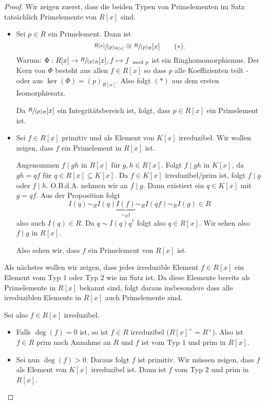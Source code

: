 \begin{proof}
	Wir zeigen zuerst, dass die beiden Typen von Primelementen im Satz tatsächlich Primelemente von $R[x]$ sind.
	\begin{itemize}
		\item Sei $p \in R$ ein Primelement. Dann ist 
			\[
				\sfrac{R[x]}{(p)_{R[x]}} \cong \sfrac{R}{(p)_{R}}[x] \tag{$*$}
			.\]
			Warum: $\Phi: R[x] \to \sfrac{R}{(p)_{R}}[x], f \mapsto f_{\mod p}$ ist ein Ringhomomorphismus.
			Der Kern von $\Phi$ besteht aus allen $f \in R[x]$ so dass $p$ alle Koeffizienten teilt - oder aus $\ker(\Phi) = (p)_{R[x]}$.
			Also folgt $(*)$ aus dem ersten Isomorphiesatz.

			Da $\sfrac{R}{(p)_{R}}[x]$ ein Integritätsbereich ist, folgt, dass $p \in R[x]$ ein Primelement ist.

		\item Sei $f \in R[x]$ primitiv und als Element von $K[x]$ irreduzibel.
			Wir wollen zeigen, dass $f$ ein Primelement in $R[x]$ ist.

			Angenommen $f \mid gh$ in $R[x]$ für $g,h \in R[x]$.
			Folgt $f \mid gh $ in $K[x]$, da $gh = qf$ für $q \in R[x] \subseteq K[x]$.
			Da $f \in K[x]$ irreduzibel/prim ist, folgt $f \mid g$ oder $f \mid h$.
			O.B.d.A. nehmen wir an $f \mid g$. Dann existiert ein $q \in K[x]$ mit $g = q f$.
			Aus der Proposition folgt 
			\[
				I(q) \sim_{R} I(q) \underbrace{I(f)}_{\sim_{R} 1} \sim_{R} I(qf) \sim_{R} I(g) \in R
			\]
			also auch $I(q) \in R$. Da $q \sim I(q) q^{*}$ folgt also $q \in R[x]$.
			Wir sehen also $f \mid g$ in $R[x]$.

			Also sehen wir, dass $f$ ein Primelement von $R[x]$ ist. 
	\end{itemize}
	Als nächstes wollen wir zeigen, dass jedes irreduzible Element $f \in R[x]$ ein Element vom Typ $1$ oder Typ $2$ wie im Satz ist.
	Da diese Elemente bereits als Primelemente in $R[x]$ bekannt sind, folgt daraus insbesondere dass alle irreduziblen Elemente in $R[x]$ auch
	Primelemente sind.

	Sei also $f \in R[x]$ irreduzibel.
	\begin{itemize}
		\item Falls $\deg(f) = 0$ ist, so ist $f \in R$ irreduzibel ($R[x]^{\times} = R^{\times}$).
			Also ist $f \in R$  prim nach Annahme an $R$ und $f$ ist vom Typ $1$ und prim in $R[x]$.
		\item Sei nun $\deg(f) > 0$. Daraus folgt $f$ ist primitiv.
			Wir müssen zeigen, dass $f$ als Element von $K[x]$ irreduzibel ist.
			Dann ist $f$ vom Typ $2$ und prim in $R[x]$.


\end{itemize}
\end{proof}
